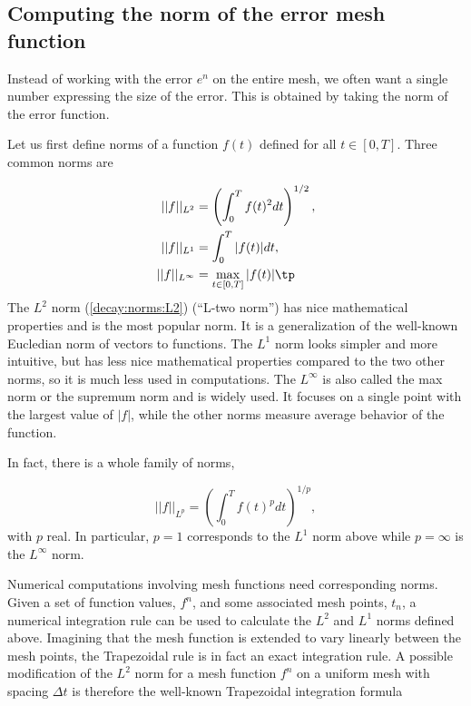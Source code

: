 \documentclass[graybox,sectrefs,envcountresetchap,open=right,final]{svmonodo}
\begin{document}
\subsection{Computing the norm of the error mesh function}
\label{decay:computing:error:norm}


Instead of working with the error $e^n$ on the entire mesh, we
often want a single number expressing the size of the error.
This is obtained by taking the norm of the error function.

Let us first define norms of a function $f(t)$
defined for all $t\in [0,T]$.
Three common norms are

\begin{align}
||f||_{L^2} &= \left( \int_0^T f(t)^2 dt\right)^{1/2},
\label{decay:norms:L2}\\ 
||f||_{L^1} &= \int_0^T |f(t)| dt,
\label{decay:norms:L1}\\ 
||f||_{L^\infty} &= \max_{t\in [0,T]}|f(t)|\tp
\label{decay:norms:Linf}
\end{align}
The $L^2$ norm (\ref{decay:norms:L2}) (``L-two norm'')
has nice mathematical properties and
is the most popular norm. It is a generalization
of the well-known Eucledian norm of vectors to functions.
The $L^1$ norm looks simpler and more intuitive, but has less
nice mathematical properties compared to the two other norms, so
it is much less used in computations.
The $L^\infty$ is also called the max norm or the supremum norm
and is widely used. It focuses on a single point with the largest
value of $|f|$, while the other norms measure average behavior of
the function.

In fact, there is a whole family of norms,

\begin{equation}
||f||_{L^p} = \left(\int_0^T f(t)^pdt\right)^{1/p},
\end{equation}
with $p$ real. In particular,
$p=1$ corresponds to the $L^1$ norm above while $p=\infty$ is the
$L^\infty$ norm.


Numerical computations involving mesh functions need corresponding norms.
Given a set of function values, $f^n$, and some associated mesh points, $t_n$,
a numerical integration rule can be used to calculate the $L^2$ and
$L^1$ norms defined above. Imagining that the mesh function is extended
to vary linearly between the mesh points, the Trapezoidal rule is
in fact an exact integration rule. A possible modification of the $L^2$
norm for a mesh function $f^n$ on a uniform mesh with spacing $\Delta t$
is therefore the well-known Trapezoidal integration formula
\end{document}
